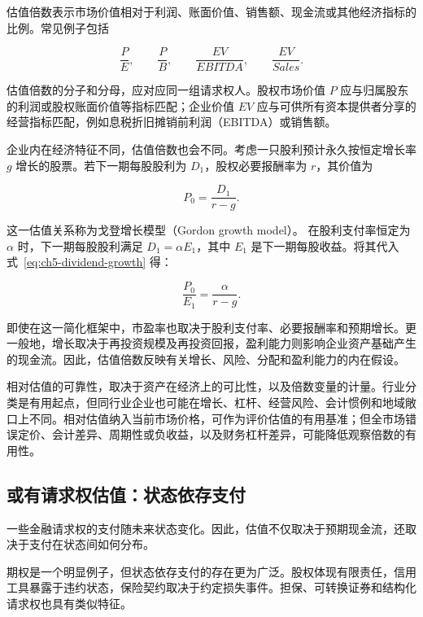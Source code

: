 估值倍数表示市场价值相对于利润、账面价值、销售额、现金流或其他经济指标的比例。常见例子包括

\begin{equation*}
\frac{P}{E},
\qquad
\frac{P}{B},
\qquad
\frac{EV}{EBITDA},
\qquad
\frac{EV}{Sales}.
\label{eq:ch5-common-multiples}
\end{equation*}

估值倍数的分子和分母，应对应同一组请求权人。股权市场价值 $P$ 应与归属股东的利润或股权账面价值等指标匹配；企业价值 $EV$ 应与可供所有资本提供者分享的经营指标匹配，例如息税折旧摊销前利润（EBITDA）或销售额。

企业内在经济特征不同，估值倍数也会不同。考虑一只股利预计永久按恒定增长率 $g$ 增长的股票。若下一期每股股利为 $D_1$，股权必要报酬率为 $r$，其价值为

\begin{equation}
P_0=\frac{D_1}{r-g}.
\label{eq:ch5-dividend-growth}
\end{equation}

这一估值关系称为戈登增长模型（Gordon growth model）。
在股利支付率恒定为 $\alpha$ 时，下一期每股股利满足 $D_1=\alpha E_1$，其中 $E_1$ 是下一期每股收益。将其代入式~\eqref{eq:ch5-dividend-growth} 得：

\begin{equation}
\frac{P_0}{E_1}=\frac{\alpha}{r-g}.
\label{eq:ch5-pe-drivers}
\end{equation}

即使在这一简化框架中，市盈率也取决于股利支付率、必要报酬率和预期增长。更一般地，增长取决于再投资规模及再投资回报，盈利能力则影响企业资产基础产生的现金流。因此，估值倍数反映有关增长、风险、分配和盈利能力的内在假设。

相对估值的可靠性，取决于资产在经济上的可比性，以及倍数变量的计量。行业分类是有用起点，但同行业企业也可能在增长、杠杆、经营风险、会计惯例和地域敞口上不同。相对估值纳入当前市场价格，可作为评价估值的有用基准；但全市场错误定价、会计差异、周期性或负收益，以及财务杠杆差异，可能降低观察倍数的有用性。


\subsection{或有请求权估值：状态依存支付}

一些金融请求权的支付随未来状态变化。因此，估值不仅取决于预期现金流，还取决于支付在状态间如何分布。

期权是一个明显例子，但状态依存支付的存在更为广泛。股权体现有限责任，信用工具暴露于违约状态，保险契约取决于约定损失事件。担保、可转换证券和结构化请求权也具有类似特征。

